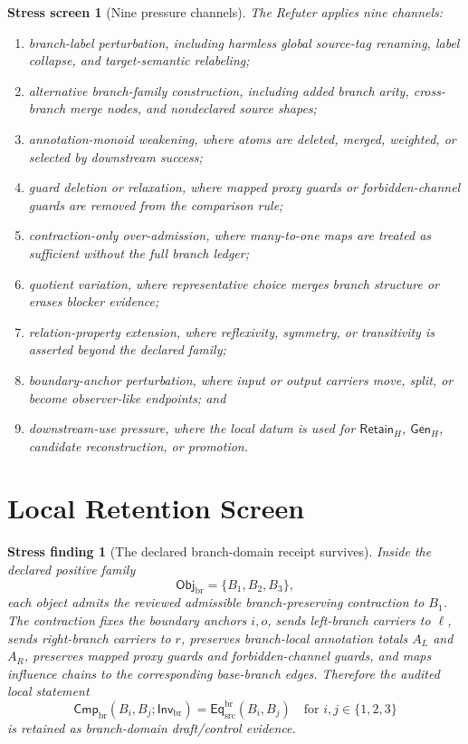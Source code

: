 \documentclass[11pt]{article}
\newcommand{\EqBr}{\mathsf{Eq}_{\mathrm{src}}^{\mathrm{br}}}
\newcommand{\ObjBr}{\mathsf{Obj}_{\mathrm{br}}}
\newcommand{\InvBr}{\mathsf{Inv}_{\mathrm{br}}}
\newcommand{\CmpBr}{\mathsf{Cmp}_{\mathrm{br}}}
\newcommand{\RetainH}{\mathsf{Retain}_{H}}
\newcommand{\GenH}{\mathsf{Gen}_{H}}
\newtheorem{stressscreen}{Stress screen}
\newtheorem{stressfinding}{Stress finding}
\begin{document}
\begin{stressscreen}[Nine pressure channels]
The Refuter applies nine channels:
\begin{enumerate}
    \item branch-label perturbation, including harmless global source-tag
    renaming, label collapse, and target-semantic relabeling;
    \item alternative branch-family construction, including added branch
    arity, cross-branch merge nodes, and nondeclared source shapes;
    \item annotation-monoid weakening, where atoms are deleted, merged,
    weighted, or selected by downstream success;
    \item guard deletion or relaxation, where mapped proxy guards or
    forbidden-channel guards are removed from the comparison rule;
    \item contraction-only over-admission, where many-to-one maps are
    treated as sufficient without the full branch ledger;
    \item quotient variation, where representative choice merges branch
    structure or erases blocker evidence;
    \item relation-property extension, where reflexivity, symmetry, or
    transitivity is asserted beyond the declared family;
    \item boundary-anchor perturbation, where input or output carriers
    move, split, or become observer-like endpoints; and
    \item downstream-use pressure, where the local datum is used for
    \(\RetainH\), \(\GenH\), candidate reconstruction, or promotion.
\end{enumerate}
\end{stressscreen}

\section{Local Retention Screen}

\begin{stressfinding}[The declared branch-domain receipt survives]
Inside the declared positive family
\[
    \ObjBr=\{B_{1},B_{2},B_{3}\},
\]
each object admits the reviewed admissible branch-preserving contraction
to \(B_{1}\). The contraction fixes the boundary anchors \(i,o\), sends
left-branch carriers to \(\ell\), sends right-branch carriers to \(r\),
preserves branch-local annotation totals \(A_{L}\) and \(A_{R}\),
preserves mapped proxy guards and forbidden-channel guards, and maps
influence chains to the corresponding base-branch edges. Therefore the
audited local statement
\[
    \CmpBr(B_i,B_j;\InvBr)=\EqBr(B_i,B_j)
    \quad\text{for } i,j\in\{1,2,3\}
\]
is retained as branch-domain draft/control evidence.
\end{stressfinding}
\end{document}
